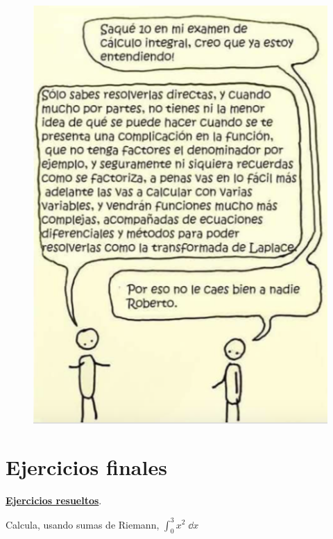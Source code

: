 \begin{figure}[]
	\centering
	\includegraphics[width=1\textwidth]{imagenes/imagenes08/T08IM25.png}
	\end{figure}

\vspace{6mm}

\section{Ejercicios finales}

\vspace{6mm}

\textbf{\underline{Ejercicios resueltos}}.

\vspace{6mm}

\begin{ejre}
Calcula, usando sumas de Riemann, $\displaystyle	\int_0^3 x^2 \; \dd x $	
\end{ejre}

